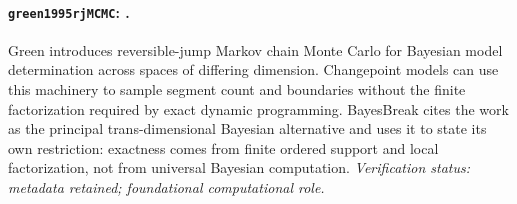 
\paragraph{\texttt{green1995rjMCMC}: \citet{green1995rjMCMC}.}
Green introduces reversible-jump Markov chain Monte Carlo for Bayesian model determination across spaces of differing dimension. Changepoint models can use this machinery to sample segment count and boundaries without the finite factorization required by exact dynamic programming. BayesBreak cites the work as the principal trans-dimensional Bayesian alternative and uses it to state its own restriction: exactness comes from finite ordered support and local factorization, not from universal Bayesian computation. \textit{Verification status: metadata retained; foundational computational role.}
